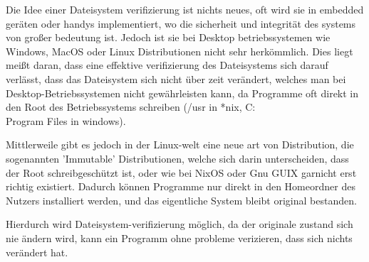 Die Idee einer Dateisystem verifizierung ist nichts neues, oft wird sie in embedded geräten oder handys implementiert, wo die sicherheit und integrität des systems von großer bedeutung ist.
Jedoch ist sie bei Desktop betriebssystemen wie Windows, MacOS oder Linux Distributionen nicht sehr herkömmlich. Dies liegt meißt daran, dass eine effektive verifizierung des Dateisystems sich darauf verlässt, dass das Dateisystem sich nicht über zeit verändert, welches man bei Desktop-Betriebssystemen nicht gewährleisten kann, da Programme oft direkt in den Root des Betriebssystems schreiben (/usr in *nix, C:\\Program Files in windows).

Mittlerweile gibt es jedoch in der Linux-welt eine neue art von Distribution, die sogenannten 'Immutable' Distributionen, welche sich darin unterscheiden, dass der Root schreibgeschützt ist, oder wie bei NixOS oder Gnu GUIX garnicht erst richtig existiert. Dadurch können Programme nur direkt in den Homeordner des Nutzers installiert werden, und das eigentliche System bleibt original bestanden.

Hierdurch wird Dateisystem-verifizierung möglich, da der originale zustand sich nie ändern wird, kann ein Programm ohne probleme verizieren, dass sich nichts verändert hat.




